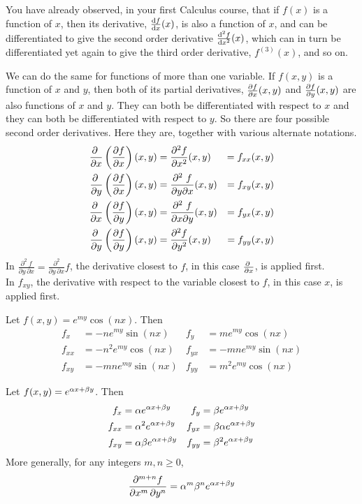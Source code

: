 You have already observed, in your first Calculus course,
that if $f(x)$ is a function of $x$, then its derivative, $\diff{f}{x}(x)$,
is also a function of $x$, and can be differentiated to give the
second order derivative $\difftwo{f}{x}(x)$, which can in turn 
be differentiated yet again to give the third order derivative, 
$f^{(3)}(x)$, and so on.

We can do the same for functions of more than one variable. 
If $f(x,y)$ is a function of $x$ and $y$, then both of its partial
derivatives, $\pdiff{f}{x}(x,y)$ and $\pdiff{f}{y}(x,y)$
are also functions of $x$ and $y$. They can both be differentiated with 
respect to $x$ and they can both be differentiated with respect to $y$. So 
there are four possible second order derivatives. Here they are, together
with various alternate notations.
\begin{alignat*}{5}
\pdiff{}{x}\left(\pdiff{f}{x}\right)(x,y)
   &=\frac{\partial^2 f}{\partial x^2}(x,y) &= f_{xx}(x,y) \\
\pdiff{}{y}\left(\pdiff{f}{x}\right)(x,y)
   &=\frac{\partial^2\ f}{\partial y\partial x}(x,y) &= f_{xy}(x,y) \\
\pdiff{}{x}\left(\pdiff{f}{y}\right)(x,y)
   &=\frac{\partial^2\ f}{\partial x\partial y}(x,y) &= f_{yx}(x,y) \\
\pdiff{}{y}\left(\pdiff{f}{y}\right)(x,y)
   &=\frac{\partial^2 f}{\partial y^2}(x,y) &= f_{yy}(x,y) 
\end{alignat*}
In $\frac{\partial^2\ f}{\partial y\,\partial x}
=\frac{\partial^2}{\partial y\,\partial x}f$, the derivative closest
to $f$, in this case $\pdiff{}{x}$, is applied first.\\
In $f_{xy}$, the derivative with respect to the variable closest
to $f$, in this case $x$, is applied first.
\begin{eg}\label{eg higher order A}
Let $f(x,y) = e^{my}\cos(nx)$. Then
\begin{align*}
f_x &=  -n e^{my}\sin(nx) &
f_y &=   m e^{my}\cos(nx) \\
f_{xx}  &=   -n^2 e^{my}\cos(nx) &
f_{yx} &=   -m n e^{my}\sin(nx) \\
f_{xy}  &=   -m n e^{my}\sin(nx) &
f_{yy} &=   m^2 e^{my}\cos(nx) 
\end{align*}
\end{eg}


\begin{eg}\label{eg higher order B}
Let $f(x,y) = e^{\alpha x+\beta y}$. Then
\begin{align*}
f_x &=  \alpha e^{\alpha x+\beta y} &
f_y &=  \beta e^{\alpha x+\beta y} \\
f_{xx}  &= \alpha^2  e^{\alpha x+\beta y} &
f_{yx} &=   \beta \alpha e^{\alpha x+\beta y} \\
f_{xy}  &=  \alpha \beta  e^{\alpha x+\beta y} &
f_{yy} &=  \beta^2 e^{\alpha x+\beta y}
\end{align*}
More generally, for any integers $m,n\ge 0$,
\begin{equation*}
\frac{\partial^{m+n} f}{\partial x^m\, \partial y^n} 
     = \alpha^m\beta^n e^{\alpha x+\beta y}
\end{equation*}
\end{eg}

